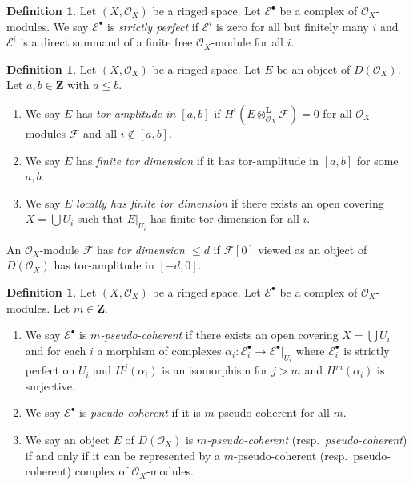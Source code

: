 \documentclass{amsart}
\theoremstyle{plain}
\theoremstyle{definition}
\newtheorem{definition}[subsection]{Definition}
\theoremstyle{remark}
\numberwithin{equation}{subsection}
\begin{document}
\begin{definition}
\label{cohomology-definition-strictly-perfect}
Let $(X, \mathcal{O}_X)$ be a ringed space.
Let $\mathcal{E}^\bullet$ be a complex of $\mathcal{O}_X$-modules.
We say $\mathcal{E}^\bullet$ is {\it strictly perfect}
if $\mathcal{E}^i$ is zero for all but finitely many $i$ and
$\mathcal{E}^i$ is a direct summand of a finite free
$\mathcal{O}_X$-module for all $i$.
\end{definition}

\begin{definition}
\label{cohomology-definition-tor-amplitude}
Let $(X, \mathcal{O}_X)$ be a ringed space.
Let $E$ be an object of $D(\mathcal{O}_X)$.
Let $a, b \in \mathbf{Z}$ with $a \leq b$.
\begin{enumerate}
\item We say $E$ has {\it tor-amplitude in $[a, b]$}
if $H^i(E \otimes_{\mathcal{O}_X}^\mathbf{L} \mathcal{F}) = 0$
for all $\mathcal{O}_X$-modules $\mathcal{F}$ and all $i \not \in [a, b]$.
\item We say $E$ has {\it finite tor dimension}
if it has tor-amplitude in $[a, b]$ for some $a, b$.
\item We say $E$ {\it locally has finite tor dimension}
if there exists an open covering $X = \bigcup U_i$ such that
$E|_{U_i}$ has finite tor dimension for all $i$.
\end{enumerate}
An $\mathcal{O}_X$-module $\mathcal{F}$ has {\it tor dimension $\leq d$}
if $\mathcal{F}[0]$ viewed as an object of $D(\mathcal{O}_X)$ has
tor-amplitude in $[-d, 0]$.
\end{definition}

\begin{definition}
\label{cohomology-definition-pseudo-coherent}
Let $(X, \mathcal{O}_X)$ be a ringed space. Let $\mathcal{E}^\bullet$
be a complex of $\mathcal{O}_X$-modules. Let $m \in \mathbf{Z}$.
\begin{enumerate}
\item We say $\mathcal{E}^\bullet$ is {\it $m$-pseudo-coherent}
if there exists an open covering $X = \bigcup U_i$ and for each $i$
a morphism of complexes
$\alpha_i : \mathcal{E}_i^\bullet \to \mathcal{E}^\bullet|_{U_i}$
where $\mathcal{E}_i^\bullet$ is strictly perfect on $U_i$ and
$H^j(\alpha_i)$ is an isomorphism for $j > m$ and $H^m(\alpha_i)$
is surjective.
\item We say $\mathcal{E}^\bullet$ is {\it pseudo-coherent}
if it is $m$-pseudo-coherent for all $m$.
\item We say an object $E$ of $D(\mathcal{O}_X)$ is
{\it $m$-pseudo-coherent} (resp.\ {\it pseudo-coherent})
if and only if it can be represented by a $m$-pseudo-coherent
(resp.\ pseudo-coherent) complex of $\mathcal{O}_X$-modules.
\end{enumerate}
\end{definition}
\end{document}
